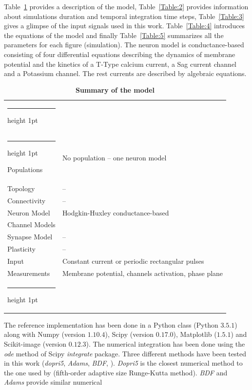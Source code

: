 \documentclass[10pt,a4paper,onecolumn]{article}
\makeatletter
\newcommand{\thickhline}{%
    \noalign {\ifnum 0=`}\fi \hrule height 1pt
    \futurelet \reserved@a \@xhline
}
\makeatother
\begin{document}
Table~\ref{Table:1} provides a description of the model, Table~\ref{Table:2}
provides information about simulations duration and temporal integration time
steps, Table~\ref{Table:3} gives a glimpse of the input signals used in this
work. Table~\ref{Table:4} introduces the equations of the model and finally 
Table~\ref{Table:5} summarizes all the parameters for each figure (simulation).
The neuron model is conductance-based consisting of four differential equations
describing the dynamics of membrane potential and the kinetics of a T-Type
calcium current, a Sag current channel and a Potassium channel. The rest
currents are described by algebraic equations.
\begin{table}[!htbp]
    \centering
    \begin{tabular}{ll}
        \thickhline
        \multicolumn{2}{c}{Model Summary} \\\thickhline
        \rowcolor{Gray}
        Populations  & No population -- one neuron model \\\rowcolor{LightGray}
        Topology     & -- \\ \rowcolor{Gray}
        Connectivity & -- \\ \rowcolor{LightGray}
        Neuron Model & Hodgkin-Huxley conductance-based \\\rowcolor{Gray}
        Channel Models & \\ \rowcolor{LightGray}
        Synapse Model & -- \\ \rowcolor{Gray}
        Plasticity & -- \\ \rowcolor{LightGray}
        Input & Constant current or periodic rectangular pulses \\\rowcolor{Gray}
        Measurements & Membrane potential, channels activation, phase plane \\
        \thickhline
    \end{tabular}
    \caption{{\bfseries \sffamily Summary of the model}} 
    \label{Table:1}
\end{table}
The reference implementation has been done in a Python class (Python $3.5.1$)
along with Numpy (version $1.10.4$), Scipy (version $0.17.0$), Matplotlib
($1.5.1$) and Scikit-image (version $0.12.3$). The numerical integration
has been done using the \emph{ode} method of Scipy \emph{integrate} package.
Three different methods have been tested in this work (\emph{dopri5}, 
\emph{Adams}, \emph{BDF}, \cite{ascher:1998}). \emph{Dopri5} is the closest
numerical method to the one used by \cite{wang:1994} (fifth-order adaptive 
size Runge-Kutta method). \emph{BDF} and \emph{Adams} provide similar numerical
\end{document}
